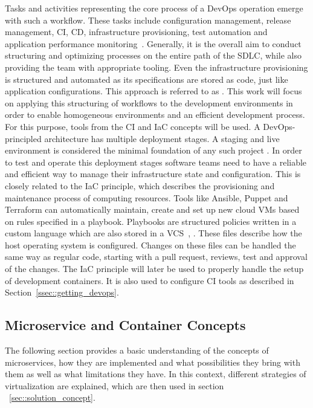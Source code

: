        \noindent Tasks and activities representing the core process of a DevOps operation emerge with such a workflow. These tasks include configuration management, release management, \ac{CI}, \ac{CD}, infrastructure provisioning, test automation and application performance monitoring~\cite{azuredevops}.
        Generally, it is the overall aim to conduct structuring and optimizing processes on the entire path of the \ac{SDLC}, while also providing the team with appropriate tooling. Even the infrastructure provisioning is structured and automated as its specifications are stored as code, just like application configurations. This approach is referred to as  \cite{base_devops}. This work will focus on applying this structuring of workflows to the development environments in order to enable homogeneous environments and an efficient development process. For this purpose, tools from the \ac{CI} and \ac{IaC} concepts will be used. \newline
        A DevOps-principled architecture has multiple deployment stages. A staging and live environment is considered the minimal foundation of any such project \cite{azuredevops}. In order to test and operate this deployment stages software teams need to have a reliable and efficient way to manage their infrastructure state and configuration. This is closely related to the \ac{IaC} principle, which describes the provisioning and maintenance process of computing resources. Tools like Ansible, Puppet and Terraform can automatically maintain, create and set up new cloud \ac{VM}s based on rules specified in a playbook. Playbooks are structured policies written in a custom language which are also stored in a \ac{VCS}~\cite{ansible2020}, \cite{azuredevops}. These files describe how the host operating system is configured. Changes on these files can be handled the same way as regular code, starting with a pull request, reviews, test and approval of the changes. The \acl{IaC} principle will later be used to properly handle the setup of development containers. It is also used to configure \acs{CI} tools as described in Section~\ref{ssec::getting_devops}.

    \subsection{Microservice and Container Concepts}\label{ssec::microservices}
    The following section provides a basic understanding of the concepts of microservices, how they are implemented and what possibilities they bring with them as well as what limitations they have. In this context, different strategies of virtualization are explained, which are then used in section ~\ref{sec::solution_concept}.

